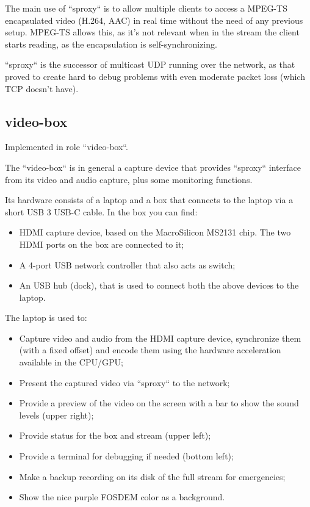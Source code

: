 \documentclass{article}
\begin{document}
The main use of ``sproxy`` is to allow multiple clients to access a MPEG-TS encapsulated video (H.264, AAC) in real time without the need of any previous setup. MPEG-TS allows this, as it's not relevant when in the stream the client starts reading, as the encapsulation is self-synchronizing.

``sproxy`` is the successor of multicast UDP running over the network, as that proved to create hard to debug problems with even moderate packet loss (which TCP doesn't have).

\subsection{video-box}

Implemented in role ``video-box``.

The ``video-box`` is in general a capture device that provides ``sproxy`` interface from its video and audio capture, plus some monitoring functions.

Its hardware consists of a laptop and a box that connects to the laptop via a short USB 3 USB-C cable. In the box you can find:

\begin{itemize}
  \item HDMI capture device, based on the MacroSilicon MS2131 chip. The two HDMI ports on the box are connected to it;
  \item A 4-port USB network controller that also acts as switch;
  \item An USB hub (dock), that is used to connect both the above devices to the laptop.
\end{itemize}

The laptop is used to:

\begin{itemize}
  \item Capture video and audio from the HDMI capture device, synchronize them (with a fixed offset) and encode them using the hardware acceleration available in the CPU/GPU;
  \item Present the captured video via ``sproxy`` to the network;
  \item Provide a preview of the video on the screen with a bar to show the sound levels (upper right);
  \item Provide status for the box and stream (upper left);
  \item Provide a terminal for debugging if needed (bottom left);
  \item Make a backup recording on its disk of the full stream for emergencies;
  \item Show the nice purple FOSDEM color as a background. 
\end{itemize}
\end{document}
